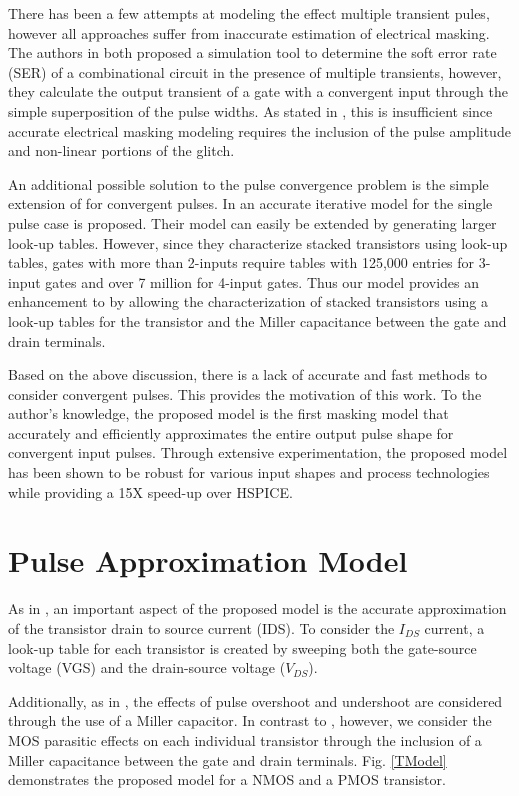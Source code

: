 There has been a few attempts at modeling the effect multiple transient pules, however all approaches suffer from inaccurate estimation of electrical masking. The authors in \cite{METSys,TahooriMET} both proposed a simulation tool to determine the soft error rate (SER) of a combinational circuit in the presence of multiple transients, however, they calculate the output transient of a gate with a convergent input through the simple superposition of the pulse widths. As stated in \cite{Accurate_Masking}, this is insufficient since accurate electrical masking modeling requires the inclusion of the pulse amplitude and non-linear portions of the glitch.

An additional possible solution to the pulse convergence problem is the simple extension of \cite{Accurate_Masking} for convergent pulses. In \cite{Accurate_Masking} an accurate iterative model for the single pulse case is proposed. Their model can easily be extended by generating larger look-up tables. However, since they characterize stacked transistors using look-up tables, gates with more than 2-inputs require tables with 125,000 entries for 3-input gates and over 7 million for 4-input gates. Thus our model provides an enhancement to \cite{Accurate_Masking} by allowing the characterization of stacked transistors using a look-up tables for the transistor and the Miller capacitance between the gate and drain terminals.

Based on the above discussion, there is a lack of accurate and fast methods to consider convergent pulses.  This provides the motivation of this work. To the author’s knowledge, the proposed model is the first masking model that accurately and efficiently approximates the entire output pulse shape for convergent input pulses. Through extensive experimentation, the proposed model has been shown to be robust for various input shapes and process technologies while providing a 15X speed-up over HSPICE.

\section{Pulse Approximation Model}
As in \cite{Accurate_Masking}, an important aspect of the proposed model is the accurate approximation of the transistor drain to source current (IDS). To consider the $I_{DS}$ current, a look-up table for each transistor is created by sweeping both the gate-source voltage (VGS) and the drain-source voltage ($V_{DS}$).
 
Additionally, as in \cite{Accurate_Masking}, the effects of pulse overshoot and undershoot are considered through the use of a Miller capacitor. In contrast to \cite{Accurate_Masking}, however, we consider the MOS parasitic effects on each individual transistor through the inclusion of a Miller capacitance between the gate and drain terminals. Fig. \ref{TModel} demonstrates the proposed model for a NMOS and a PMOS transistor. 

